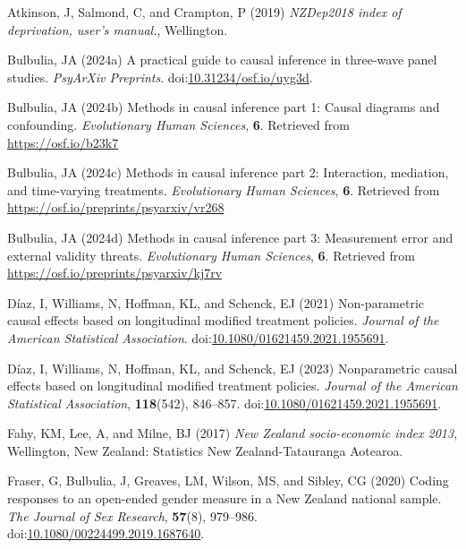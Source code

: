 \documentclass[
  singlecolumn]{article}
\newlength{\cslhangindent}
\newenvironment{CSLReferences}[2] %
 {\begin{list}{}{%
  \setlength{\itemindent}{0pt}
  \setlength{\leftmargin}{0pt}
  \setlength{\parsep}{0pt}
  \ifodd #1
   \setlength{\leftmargin}{\cslhangindent}
   \setlength{\itemindent}{-1\cslhangindent}
  \fi
  \setlength{\itemsep}{#2\baselineskip}}}
 {\end{list}}
\begin{document}
\label{refs}
\begin{CSLReferences}{1}{0}
Atkinson, J, Salmond, C, and Crampton, P (2019) \emph{NZDep2018 index of
deprivation, user{'}s manual.}, Wellington.

Bulbulia, JA (2024a) A practical guide to causal inference in three-wave
panel studies. \emph{PsyArXiv Preprints}.
doi:\href{https://doi.org/10.31234/osf.io/uyg3d}{10.31234/osf.io/uyg3d}.

Bulbulia, JA (2024b) Methods in causal inference part 1: Causal diagrams
and confounding. \emph{Evolutionary Human Sciences}, \textbf{6}.
Retrieved from \url{https://osf.io/b23k7}

Bulbulia, JA (2024c) Methods in causal inference part 2: Interaction,
mediation, and time-varying treatments. \emph{Evolutionary Human
Sciences}, \textbf{6}. Retrieved from
\url{https://osf.io/preprints/psyarxiv/vr268}

Bulbulia, JA (2024d) Methods in causal inference part 3: Measurement
error and external validity threats. \emph{Evolutionary Human Sciences},
\textbf{6}. Retrieved from \url{https://osf.io/preprints/psyarxiv/kj7rv}

Díaz, I, Williams, N, Hoffman, KL, and Schenck, EJ (2021) Non-parametric
causal effects based on longitudinal modified treatment policies.
\emph{Journal of the American Statistical Association}.
doi:\href{https://doi.org/10.1080/01621459.2021.1955691}{10.1080/01621459.2021.1955691}.

Díaz, I, Williams, N, Hoffman, KL, and Schenck, EJ (2023) Nonparametric
causal effects based on longitudinal modified treatment policies.
\emph{Journal of the American Statistical Association},
\textbf{118}(542), 846--857.
doi:\href{https://doi.org/10.1080/01621459.2021.1955691}{10.1080/01621459.2021.1955691}.

Fahy, KM, Lee, A, and Milne, BJ (2017) \emph{{N}ew {Z}ealand
socio-economic index 2013}, Wellington, New Zealand: Statistics New
Zealand-Tatauranga Aotearoa.

Fraser, G, Bulbulia, J, Greaves, LM, Wilson, MS, and Sibley, CG (2020)
Coding responses to an open-ended gender measure in a {N}ew {Z}ealand
national sample. \emph{The Journal of Sex Research}, \textbf{57}(8),
979--986.
doi:\href{https://doi.org/10.1080/00224499.2019.1687640}{10.1080/00224499.2019.1687640}.


\end{CSLReferences}
\end{document}

